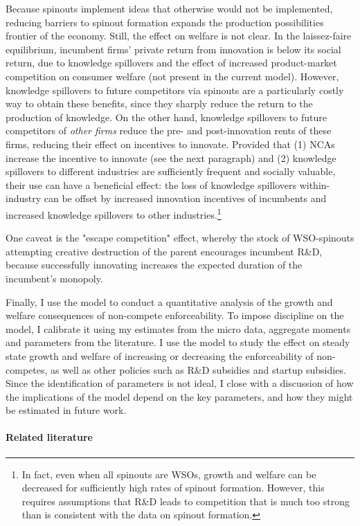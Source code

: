 \documentclass[12pt,english]{article}
\theoremstyle{remark}
\begin{document}
Because spinouts implement ideas that otherwise would not be implemented, reducing barriers to spinout formation expands the production possibilities frontier of the economy. Still, the effect on welfare is not clear. In the laissez-faire equilibrium, incumbent firms' private return from innovation is below its social return, due to knowledge spillovers and the effect of increased product-market competition on consumer welfare (not present in the current model). However, knowledge spillovers to future competitors via spinouts are a particularly costly way to obtain these benefits, since they sharply reduce the return to the production of knowledge. On the other hand, knowledge spillovers to future competitors of \textit{other firms} reduce the pre- and post-innovation rents of these firms, reducing their effect on incentives to innovate. Provided that (1) NCAs increase the incentive to innovate (see the next paragraph) and (2) knowledge spillovers to different industries are sufficiently frequent and socially valuable, their use can have a beneficial effect: the loss of knowledge spillovers within-industry can be offset by increased innovation incentives of incumbents and increased knowledge spillovers to other industries.\footnote{In fact, even when all spinouts are WSOs, growth and welfare can be decreased for sufficiently high rates of spinout formation. However, this requires assumptions that R\&D leads to competition that is much too strong than is consistent with the data on spinout formation.}

One caveat is the "escape competition" effect, whereby the stock of WSO-spinouts attempting creative destruction of the parent encourages incumbent R\&D, because successfully innovating increases the expected duration of the incumbent's monopoly.

Finally, I use the model to conduct a quantitative analysis of the growth and welfare consequences of non-compete enforceability. To impose discipline on the model, I calibrate it using my estimates from the micro data, aggregate moments and parameters from the literature. I use the model to study the effect on steady state growth and welfare of increasing or decreasing the enforceability of non-competes, as well as other policies such as R\&D subsidies and startup subsidies. Since the identification of parameters is not ideal, I close with a discussion of how the implications of the model depend on the key parameters, and how they might be estimated in future work. 

\paragraph{Related literature}
\end{document}
